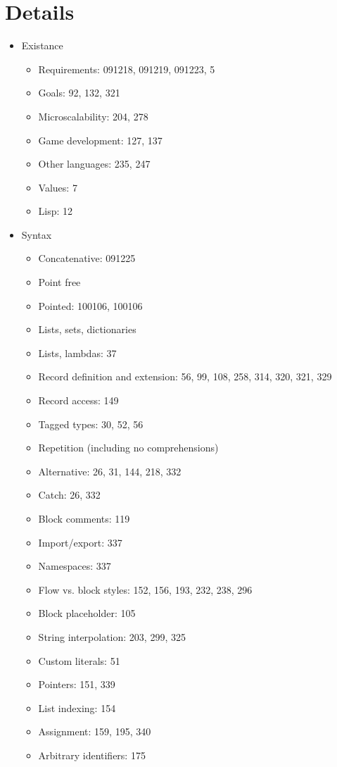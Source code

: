 \section{Details}
\begin{itemize}
\item Existance
  \begin{itemize}
  \item Requirements: 091218, 091219, 091223, 5
  \item Goals: 92, 132, 321
  \item Microscalability: 204, 278
  \item Game development: 127, 137
  \item Other languages: 235, 247
  \item Values: 7
  \item Lisp: 12
  \end{itemize}
\item Syntax
  \begin{itemize}
  \item Concatenative: 091225
  \item Point free
  \item Pointed: 100106, 100106
  \item Lists, sets, dictionaries
  \item Lists, lambdas: 37
  \item Record definition and extension: 56, 99, 108, 258, 314, 320, 321, 329
  \item Record access: 149
  \item Tagged types: 30, 52, 56
  \item Repetition (including no comprehensions)
  \item Alternative: 26, 31, 144, 218, 332
  \item Catch: 26, 332
  \item Block comments: 119
  \item Import/export: 337
  \item Namespaces: 337
  \item Flow vs. block styles: 152, 156, 193, 232, 238, 296
  \item Block placeholder: 105
  \item String interpolation: 203, 299, 325
  \item Custom literals: 51
  \item Pointers: 151, 339
  \item List indexing: 154
  \item Assignment: 159, 195, 340
  \item Arbitrary identifiers: 175

\end{itemize}
\end{itemize}
